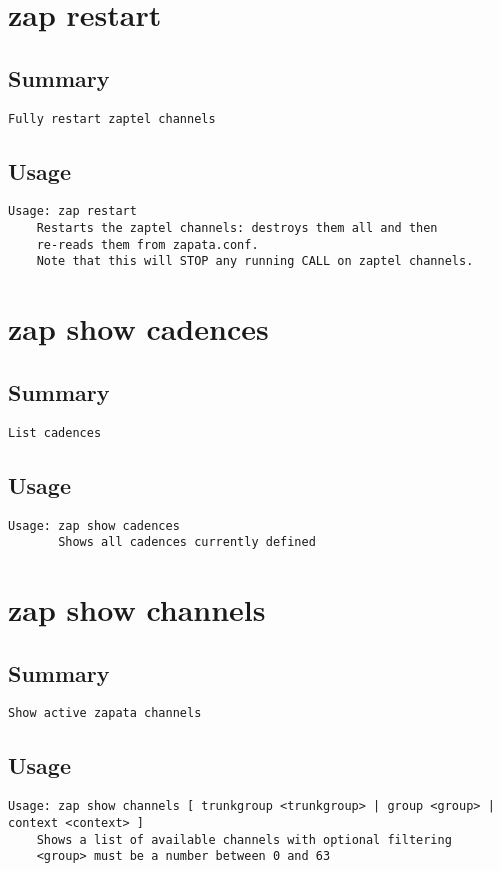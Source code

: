 \section{zap restart}
\subsection{Summary}
\begin{verbatim}
Fully restart zaptel channels
\end{verbatim}
\subsection{Usage}
\begin{verbatim}
Usage: zap restart
	Restarts the zaptel channels: destroys them all and then
	re-reads them from zapata.conf.
	Note that this will STOP any running CALL on zaptel channels.

\end{verbatim}


\section{zap show cadences}
\subsection{Summary}
\begin{verbatim}
List cadences
\end{verbatim}
\subsection{Usage}
\begin{verbatim}
Usage: zap show cadences
       Shows all cadences currently defined

\end{verbatim}


\section{zap show channels}
\subsection{Summary}
\begin{verbatim}
Show active zapata channels
\end{verbatim}
\subsection{Usage}
\begin{verbatim}
Usage: zap show channels [ trunkgroup <trunkgroup> | group <group> | context <context> ]
	Shows a list of available channels with optional filtering
	<group> must be a number between 0 and 63

\end{verbatim}


